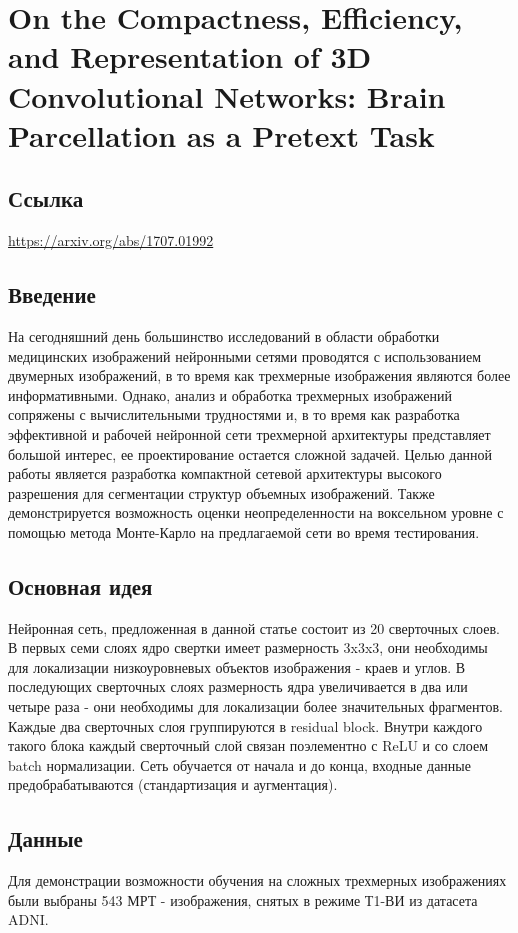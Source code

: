 \section{On the Compactness, Efficiency, and Representation of 3D Convolutional Networks: Brain Parcellation as a Pretext Task}

\subsection*{Ссылка}\url{https://arxiv.org/abs/1707.01992}
\subsection*{Введение}
На сегодняшний день большинство исследований в области обработки медицинских 
изображений нейронными сетями проводятся с использованием двумерных изображений, в то время как 
трехмерные изображения являются более информативными. Однако, анализ и обработка трехмерных изображений сопряжены 
с вычислительными трудностями и, в то время как разработка эффективной и рабочей нейронной сети 
трехмерной архитектуры представляет большой интерес, ее проектирование остается сложной задачей.
 Целью данной работы является разработка компактной сетевой архитектуры высокого разрешения для сегментации 
 структур объемных изображений. Также демонстрируется возможность оценки неопределенности на воксельном уровне 
 с помощью метода Монте-Карло на предлагаемой сети во время тестирования.
\subsection*{Основная идея}
Нейронная сеть, предложенная в данной статье состоит из 20 сверточных слоев.
 В первых семи слоях ядро свертки имеет размерность 3x3x3, они необходимы для 
 локализации низкоуровневых объектов изображения - краев и углов. В последующих сверточных 
 слоях размерность ядра увеличивается в два или четыре раза - они необходимы для локализации 
 более значительных фрагментов. Каждые два сверточных слоя группируются в residual block. 
 Внутри каждого такого блока каждый сверточный слой связан поэлементно с ReLU и со слоем batch нормализации. 
 Сеть обучается от начала и до конца, входные данные предобрабатываются (стандартизация и аугментация). 
\subsection*{Данные}
Для демонстрации возможности обучения на сложных трехмерных изображениях были выбраны 543 МРТ - 
изображения, снятых в режиме Т1-ВИ из датасета ADNI. 
